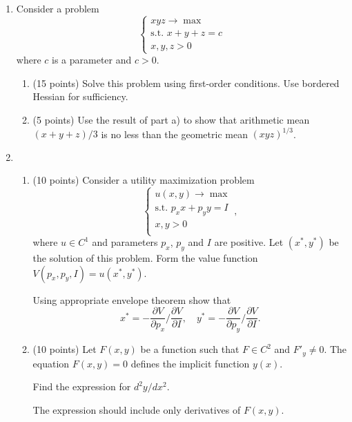 \documentclass[12pt]{article} %
\theoremstyle{definition} %
\begin{document}
\begin{enumerate}[resume]
\item Consider a problem 
\[
  \begin{cases}
xyz \to \max \\
\text{s.t. } x+ y+ z = c \\
x, y, z >0 
  \end{cases}
\]
where $c$ is a parameter and $c>0$.
\begin{enumerate}
  \item (15 points) Solve this problem using first-order conditions. Use bordered
Hessian for sufficiency.
\item (5 points) Use the result of part a) to show that arithmetic mean 
$(x + y + z)/3$ is 
no less than the geometric mean  $(xyz)^{1/3}$.
\end{enumerate}

\item 
\begin{enumerate}
  \item (10 points) Consider a utility maximization problem
\[
  \begin{cases}
    u(x,y) \to \max \\
    \text{s.t. } p_x x + p_y y  = I \\
      x, y > 0 \\
  \end{cases},
\]
where $u\in C^1$ and parameters $p_x$, $p_y$ and $I$ are positive. 
Let $(x^*, y^*)$ be the solution of this problem. Form the value function
$V(p_x, p_y, I) = u(x^*, y^*)$. 

Using appropriate envelope theorem show that 
\[
  x^* = - \frac{\partial V}{\partial p_x} / \frac{\partial V}{\partial I}, \quad 
  y^* = - \frac{\partial V}{\partial p_y} / \frac{\partial V}{\partial I}.
\]


\item (10 points) Let $F(x,y)$ be a function such that $F\in C^2$ and $F'_y  \neq 0$. 
The equation $F(x, y)=0$ defines the implicit function $y(x)$.

Find the expression for $d^2 y / dx^2$.

The expression should include only derivatives of $F(x,y)$.
\end{enumerate}


\end{enumerate}
\end{document}

